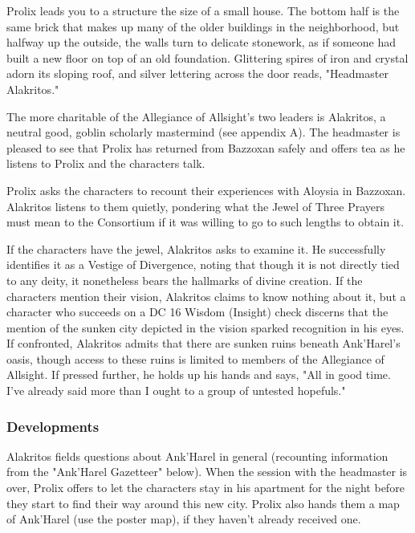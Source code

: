 \documentclass[10pt,a4paper,twoside,bg=print,twocolumn,openany,nodeprecatedcode]{dndbook}
\begin{document}
\begin{DndReadAloud}{}
Prolix leads you to a structure the size of a small house. The bottom half is the same brick that makes up many of the older buildings in the neighborhood, but halfway up the outside, the walls turn to delicate stonework, as if someone had built a new floor on top of an old foundation. Glittering spires of iron and crystal adorn its sloping roof, and silver lettering across the door reads, "Headmaster Alakritos."

\end{DndReadAloud}

The more charitable of the Allegiance of Allsight's two leaders is Alakritos, a neutral good, goblin scholarly mastermind (see appendix A). The headmaster is pleased to see that Prolix has returned from Bazzoxan safely and offers tea as he listens to Prolix and the characters talk.

Prolix asks the characters to recount their experiences with Aloysia in Bazzoxan. Alakritos listens to them quietly, pondering what the Jewel of Three Prayers must mean to the Consortium if it was willing to go to such lengths to obtain it.

If the characters have the jewel, Alakritos asks to examine it. He successfully identifies it as a Vestige of Divergence, noting that though it is not directly tied to any deity, it nonetheless bears the hallmarks of divine creation. If the characters mention their vision, Alakritos claims to know nothing about it, but a character who succeeds on a DC 16 Wisdom (Insight) check discerns that the mention of the sunken city depicted in the vision sparked recognition in his eyes. If confronted, Alakritos admits that there are sunken ruins beneath Ank'Harel's oasis, though access to these ruins is limited to members of the Allegiance of Allsight. If pressed further, he holds up his hands and says, "All in good time. I've already said more than I ought to a group of untested hopefuls."

\subsubsection{Developments}
Alakritos fields questions about Ank'Harel in general (recounting information from the "Ank'Harel Gazetteer" below). When the session with the headmaster is over, Prolix offers to let the characters stay in his apartment for the night before they start to find their way around this new city. Prolix also hands them a map of Ank'Harel (use the poster map), if they haven't already received one.
\end{document}
